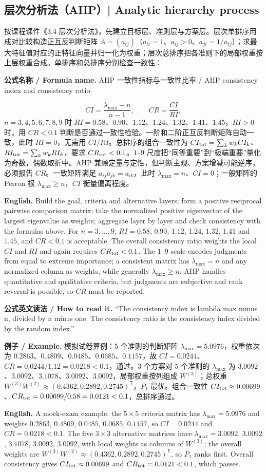\documentclass[UTF8,11pt,a4paper]{ctexart}
\newcommand{\EN}[1]{\par\noindent\textbf{English.} #1\par}
\newcommand{\READ}[1]{\par\noindent\textbf{公式英文读法 / How to read it.} #1\par}
\newcommand{\FORMULA}[2]{\par\noindent\textbf{公式名称 / Formula name.} #1 / #2\par}
\newcommand{\EX}[2]{\par\noindent\textbf{例子 / Example.} #1\par\EN{#2}}
\begin{document}
\subsection{层次分析法（AHP）| Analytic hierarchy process}
按课程课件《3.4 层次分析法》，先建立目标层、准则层与方案层。层次单排序用成对比较构造正互反判断矩阵 $A=(a_{ij})$（$a_{ii}=1$、$a_{ij}>0$、$a_{ji}=1/a_{ij}$）；求最大特征值对应的正特征向量并归一化为权重；层次总排序把各准则下的局部权重按上层权重合成。单排序和总排序分别检查一致性：
\FORMULA{AHP 一致性指标与一致性比率}{AHP consistency index and consistency ratio}
\[
CI=\frac{\lambda_{\max}-n}{n-1},\qquad CR=\frac{CI}{RI},
\]
$n=3,4,5,6,7,8,9$ 时 $RI=0.58$、$0.90$、$1.12$、$1.24$、$1.32$、$1.41$、$1.45$，$RI>0$ 时，用 $CR<0.1$ 判断是否通过一致性检验。一阶和二阶正互反判断矩阵自动一致，此时 $RI=0$，无需用 $CI/RI$。总排序的组合一致性为 $CI_{\rm tot}=\sum_kw_kCI_k$、$RI_{\rm tot}=\sum_kw_kRI_k$，要求 $CR_{\rm tot}<0.1$。$1$--$9$ 尺度把“同等重要”到“极端重要”量化为奇数，偶数取折中。AHP 兼顾定量与定性，但判断主观、方案增减可能逆序，必须报告 $CR$。一致矩阵满足 $a_{ij}a_{jk}=a_{ik}$，此时 $\lambda_{\max}=n$、$CI=0$；一般矩阵的 Perron 根 $\lambda_{\max}\ge n$，$CI$ 衡量偏离程度。
\EN{Build the goal, criteria and alternative layers; form a positive reciprocal pairwise comparison matrix; take the normalized positive eigenvector of the largest eigenvalue as weights; aggregate layer by layer and check consistency with the formulas above. For $n=3,\ldots,9$, $RI=0.58$, $0.90$, $1.12$, $1.24$, $1.32$, $1.41$ and $1.45$, and $CR<0.1$ is acceptable. The overall consistency ratio weights the local $CI$ and $RI$ and again requires $CR_{\rm tot}<0.1$. The $1$--$9$ scale encodes judgments from equal to extreme importance; a consistent matrix has $\lambda_{\max}=n$ and any normalized column as weights, while generally $\lambda_{\max}\ge n$. AHP handles quantitative and qualitative criteria, but judgments are subjective and rank reversal is possible, so $CR$ must be reported.}
\READ{“The consistency index is lambda max minus n, divided by n minus one. The consistency ratio is the consistency index divided by the random index.”}
\EX{模拟试卷算例：$5$ 个准则的判断矩阵 $\lambda_{\max}=5.0976$，权重依次为 $0.2863$、$0.4809$、$0.0485$、$0.0685$、$0.1157$，故 $CI=0.0244$、$CR=0.0244/1.12=0.0218<0.1$，通过。$3$ 个方案对 $5$ 个准则的 $\lambda_{\max}$ 为 $3.0092$、$3.0092$、$3.1078$、$3.0092$、$3.0092$，局部权重按列组成 $W^{(3)}$；总权重 $W^{(3)}W^{(2)}\approx(0.4362,0.2892,0.2745)^{\mathsf T}$，$P_1$ 最优。组合一致性 $CI_{\rm tot}\approx0.00699$、$CR_{\rm tot}=0.00699/0.58=0.0121<0.1$，总排序通过。}{A mock-exam example: the $5\times5$ criteria matrix has $\lambda_{\max}=5.0976$ and weights $0.2863$, $0.4809$, $0.0485$, $0.0685$, $0.1157$, so $CI=0.0244$ and $CR=0.0218<0.1$. The five $3\times3$ alternative matrices have $\lambda_{\max}=3.0092$, $3.0092$, $3.1078$, $3.0092$, $3.0092$, with local weights as columns of $W^{(3)}$; the overall weights are $W^{(3)}W^{(2)}\approx(0.4362,0.2892,0.2745)^{\mathsf T}$, so $P_1$ ranks first. Overall consistency gives $CI_{\rm tot}\approx0.00699$ and $CR_{\rm tot}=0.0121<0.1$, which passes.}
\end{document}
